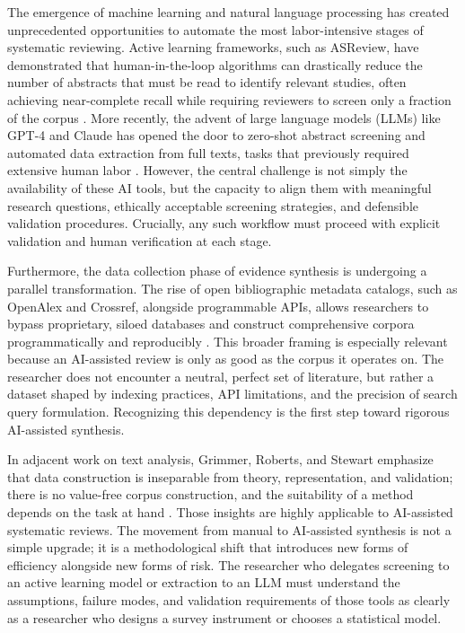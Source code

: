 \documentclass[12pt]{article}
\begin{document}
The emergence of machine learning and natural language processing has created unprecedented opportunities to automate the most labor-intensive stages of systematic reviewing. Active learning frameworks, such as ASReview, have demonstrated that human-in-the-loop algorithms can drastically reduce the number of abstracts that must be read to identify relevant studies, often achieving near-complete recall while requiring reviewers to screen only a fraction of the corpus \cite{vandeschoot2021asreview}. More recently, the advent of large language models (LLMs) like GPT-4 and Claude has opened the door to zero-shot abstract screening and automated data extraction from full texts, tasks that previously required extensive human labor \cite{mahmoudi2025,kim2025}. However, the central challenge is not simply the availability of these AI tools, but the capacity to align them with meaningful research questions, ethically acceptable screening strategies, and defensible validation procedures. Crucially, any such workflow must proceed with explicit validation and human verification at each stage.

Furthermore, the data collection phase of evidence synthesis is undergoing a parallel transformation. The rise of open bibliographic metadata catalogs, such as OpenAlex and Crossref, alongside programmable APIs, allows researchers to bypass proprietary, siloed databases and construct comprehensive corpora programmatically and reproducibly \cite{delgado2024,culbert2025}. This broader framing is especially relevant because an AI-assisted review is only as good as the corpus it operates on. The researcher does not encounter a neutral, perfect set of literature, but rather a dataset shaped by indexing practices, API limitations, and the precision of search query formulation. Recognizing this dependency is the first step toward rigorous AI-assisted synthesis.

In adjacent work on text analysis, Grimmer, Roberts, and Stewart emphasize that data construction is inseparable from theory, representation, and validation; there is no value-free corpus construction, and the suitability of a method depends on the task at hand \cite{grimmer2022text}. Those insights are highly applicable to AI-assisted systematic reviews. The movement from manual to AI-assisted synthesis is not a simple upgrade; it is a methodological shift that introduces new forms of efficiency alongside new forms of risk. The researcher who delegates screening to an active learning model or extraction to an LLM must understand the assumptions, failure modes, and validation requirements of those tools as clearly as a researcher who designs a survey instrument or chooses a statistical model.
\end{document}
